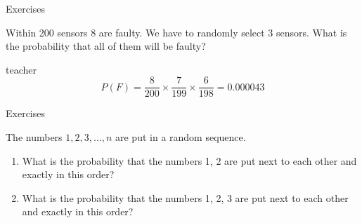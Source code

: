 \begin{frame}{Exercises}
    \begin{example}
        \medskip
        Within 200 sensors 8 are faulty. We have to randomly select 3 sensors. What is the probability that all of them will be faulty?
        \begin{shownto}{teacher}
            \medskip
            \pause
            \begin{equation*}
            P(F) = \frac{8}{200} \times \frac{7}{199} \times \frac{6}{198} = 0.000043
            \end{equation*}
        \end{shownto}

    \end{example}
\end{frame}

\begin{frame}{Exercises}
    \begin{example}
        \medskip
        The numbers $1, 2, 3, ..., n$ are put in a random sequence.
        \begin{enumerate}
            \item What is the probability that the numbers 1, 2 are put next to each other and exactly in this order?
            \item What is the probability that the numbers 1, 2, 3 are put next to each other and exactly in this order?
        \end{enumerate}
    \end{example}
\end{frame}

